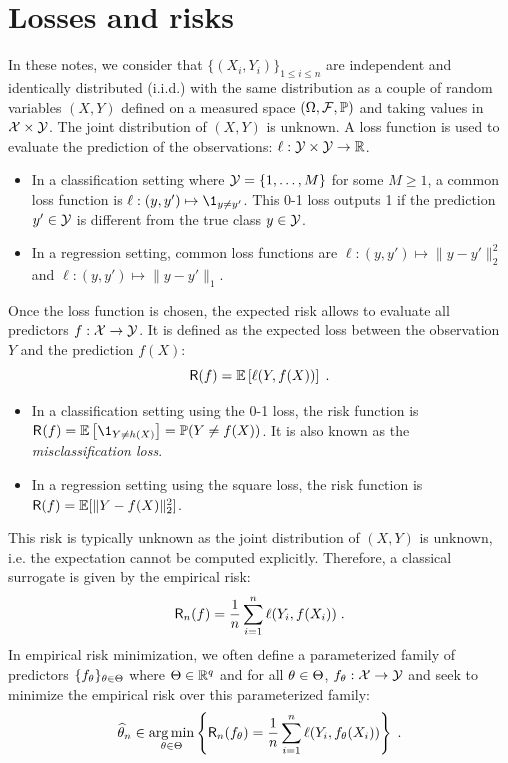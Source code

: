 \section{Losses and risks}
In these notes, we consider that $\{(X_i,Y_i)\}_{1\leqslant i \leqslant n}$ are independent and identically distributed (i.i.d.) with the same distribution as a couple of random variables $(X,Y)$ defined on  a measured space $(\Omega,\mathcal{F},\mathbb{P})$ and taking values in $\mathcal{X}\times\mathcal{Y}$. The joint distribution of $(X,Y)$ is unknown. A loss function is used to evaluate the prediction of the observations: $\ell: \mathcal{Y}\times \mathcal{Y} \to \mathbb{R}$.
\begin{itemize}
\item In a classification setting where $\mathcal{Y} = \{1,\ldots,M\}$ for some $M\geqslant 1$, a common loss function is $\ell : (y,y')\mapsto \1_{y\neq y'}$. This 0-1 loss outputs 1 if the prediction $y'\in\mathcal{Y}$ is different from the true class $y\in\mathcal{Y}$.
\item In a regression setting,  common loss functions are $\ell : (y,y')\mapsto \|y-y'\|_2^2$ and $\ell : (y,y')\mapsto \|y-y'\|_1$.
\end{itemize}
Once the loss function is chosen, the expected risk allows to evaluate all predictors $f: \mathcal{X}\to \mathcal{Y}$. It is defined  as the expected loss between the observation $Y$ and the prediction $f(X)$:
$$
\mathsf{R}(f) = \mathbb{E}\left[\ell(Y,f(X))\right]\;.
$$
\begin{itemize}
\item In a classification setting using the 0-1 loss, the risk function is $\mathsf{R}_{}(f) = \bE\left[\1_{Y\neq h(X)}\right]= \bP(Y\neq f(X))$. It is also known as the {\em misclassification loss}.
\item In a regression setting using the square loss,   the risk function is $\mathsf{R}(f) = \mathbb{E}[\|Y-f(X)\|^2_2]$.
\end{itemize}
This risk is typically unknown as the joint distribution of $(X,Y)$ is unknown, i.e. the expectation cannot be computed explicitly. Therefore, a classical surrogate is given by the empirical risk:
$$
\mathsf{R}_n(f) = \frac{1}{n}\sum_{i=1}^n\ell(Y_i,f(X_i))\;.
$$
In empirical risk minimization, we often define a parameterized family of predictors $\{f_\theta\}_{\theta\in \Theta}$ where $\Theta\in \mathbb{R}^q$ and for all $\theta\in\Theta$, $f_\theta: \mathcal{X}\to \mathcal{Y}$ and seek to minimize the empirical risk over this parameterized family:
$$
\widehat\param_n \in\argmin_{\param\in\paramset} \left\{\mathsf{R}_n(f_\param) = \frac{1}{n}\sum_{i=1}^n\ell(Y_i,f_\param(X_i)) \right\}\eqsp.
$$

